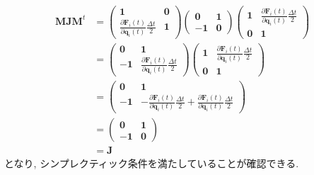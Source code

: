 \begin{align}
  \bm{M}\bm{J}\bm{M}^{t}
  &=
  \begin{pmatrix}
    \bm{1} &
    \bm{0} \\
    \frac{\partial \bm{F}_{i}(t)}{\partial \bm{q}_{i}(t)} \frac{\Delta t}{2} &
    \bm{1}
  \end{pmatrix}
  \begin{pmatrix}
     \bm{0} & \bm{1} \\
    -\bm{1} & \bm{0}
  \end{pmatrix}
  \begin{pmatrix}
    \bm{1} &
    \frac{\partial \bm{F}_{i}(t)}{\partial \bm{q}_{i}(t)} \frac{\Delta t}{2} \\
    \bm{0} &
    \bm{1}
  \end{pmatrix}
  \\
  &=
  \begin{pmatrix}
     \bm{0} &
     \bm{1} \\
    -\bm{1} &
    \frac{\partial \bm{F}_{i}(t)}{\partial \bm{q}_{i}(t)} \frac{\Delta t}{2}
  \end{pmatrix}
  \begin{pmatrix}
    \bm{1} &
    \frac{\partial \bm{F}_{i}(t)}{\partial \bm{q}_{i}(t)} \frac{\Delta t}{2} \\
    \bm{0} &
    \bm{1}
  \end{pmatrix}
  \\
  &=
  \begin{pmatrix}
    \bm{0} &
    \bm{1} \\
   -\bm{1} &
   -\frac{\partial \bm{F}_{i}(t)}{\partial \bm{q}_{i}(t)} \frac{\Delta t}{2}
   +\frac{\partial \bm{F}_{i}(t)}{\partial \bm{q}_{i}(t)} \frac{\Delta t}{2}
  \end{pmatrix}
  \\
  &=
  \begin{pmatrix}
     \bm{0} & \bm{1}\\
    -\bm{1} & \bm{0}
  \end{pmatrix}
  \\
  &=
  \bm{J}
\end{align}
となり, シンプレクティック条件を満たしていることが確認できる. 

